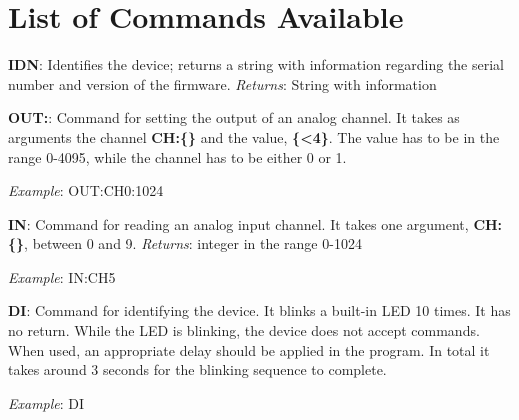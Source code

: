 \section{List of Commands Available}\label{list-of-commandsavailable}
\textbf{{IDN}}: Identifies the device; returns a string with information
regarding the serial number and version of the firmware. \emph{Returns}:
String with information

\textbf{{OUT}:}: Command for setting the output of an analog channel. It
takes as arguments the channel \textbf{{CH}:\{\}} and the value,
\textbf{\{\textless{}4\}}. The value has to be in the range 0-4095,
while the channel has to be either 0 or 1.

\emph{Example}: {OUT}:{CH0}:1024

\textbf{{IN}}: Command for reading an analog input channel. It takes one
argument, \textbf{{CH}:\{\}}, between 0 and 9. \emph{Returns}: integer
in the range 0-1024

\emph{Example}: {IN}:{CH5}

\textbf{{DI}}: Command for identifying the device. It blinks a built-in LED 10 times.
It has no return. While the LED is blinking, the device does not accept commands. When used, an appropriate delay should be applied in the program. In total it takes around 3 
seconds for the blinking sequence to complete.

\emph{Example}: {DI}
